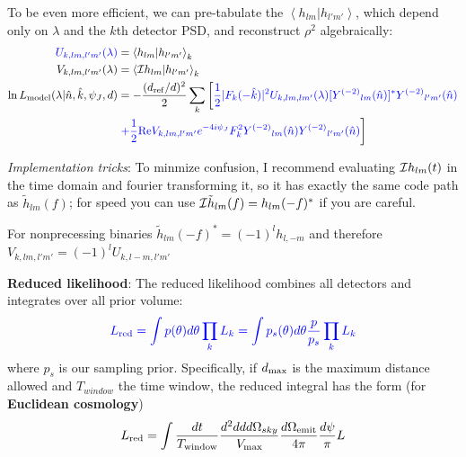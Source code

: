 \documentclass[twocolumn,prd,nofootinbib]{revtex4}
\newcommand\Y[1]{Y^{(#1)}{}}
\newcommand\qmstateproduct[2]{\left\langle#1|#2\right\rangle}
\begin{document}
\begin{widetext}
\begin{shaded}
To be even more efficient, we can pre-tabulate the $\qmstateproduct{h_{lm}}{h_{l'm'}}$, which depend only on $\lambda$
and the $k$th detector PSD, and reconstruct $\rho^2$ algebraically:
\begin{subequations}
\label{eq:ComputeRhoViaInnerProductMatrix}
\begin{align}
{\color{blue} U_{k,lm,l'm'}(\lambda)}& = \qmstateproduct{h_{lm}}{h_{l'm'}}_k \\
V_{k,lm,l'm'}(\lambda)& = \qmstateproduct{{\cal I}h_{lm}}{h_{l'm'}}_k \\
\ln L_{\rm model}(\lambda|\hat{n},\hat{k},\psi_J,d) &=
   -\frac{(d_{\rm ref}/d)^2}{2}\sum_k
\left[
{\color{blue}
 \frac{1}{2}|F_k(-\hat{k})|^2 U_{k,lm,lm'}(\lambda)[\Y{-2}_{lm}(\hat{n})]^*\Y{-2}_{l'm'}(\hat{n})
}
 \right. \nonumber \\ & \left.
 {\color{blue}
+
 \frac{1}{2} \text{Re} V_{k,lm,l'm'} e^{-4i\psi_J}F_k^2 \Y{-2}_{lm}(\hat{n})\Y{-2}_{l'm'}(\hat{n})
}
\right]
\end{align}
\end{subequations}

\noindent \emph{Implementation tricks}: To minmize confusion, I recommend evaluating ${\cal I}h_{lm}(t)$ in the time
domain and fourier transforming it, so it has exactly the same code path as $\tilde{h}_{lm}(f)$; for speed you can use
${\cal I}\tilde{h}_{lm}(f) = h_{lm}(-f)^*$ if you are careful.

For nonprecessing binaries $\tilde{h}_{lm}(-f)^*=(-1)^lh_{l,-m}$ and therefore $V_{k,lm,l'm'} = (-1)^l U_{k,l-m,l'm'}$
\end{shaded}

\end{widetext}




\noindent \textbf{Reduced likelihood}: The reduced likelihood combines all detectors and integrates over all prior
volume:
\begin{eqnarray}
{\color{blue} L_{\rm red} = \int p(\theta) d\theta \prod_k L_k = \int p_s(\theta) d\theta \frac{p}{p_s}\prod_k L_k }
\end{eqnarray}
where $p_s$ is our sampling prior.  Specifically, if $d_{\rm max}$ is the maximum distance allowed and $T_{window}$ the
time window, the reduced integral has the form (for \textbf{Euclidean cosmology})
\begin{eqnarray}
L_{\rm red} = \int \frac{dt}{T_{\rm window}} \frac{d^2 dd d\Omega_{sky} }{V_{\rm max}} \frac{d\Omega_{\rm
    emit}}{4\pi} \frac{d\psi}{\pi} L
\end{eqnarray}
\end{document}
